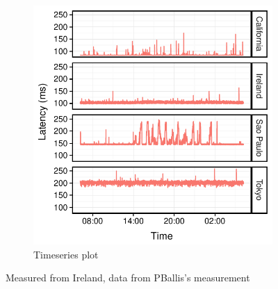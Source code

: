 \begin{figure}
\begin{subfigure}{.48\columnwidth}
    \includegraphics[width=.95\linewidth]{figures/latency-ts.pdf}
    \caption{Timeseries plot}
    \label{fig:ts}
  \end{subfigure}
  \caption{Measured from Ireland, data from PBallis's measurement}
  \label{fig:bw}
\end{figure}

